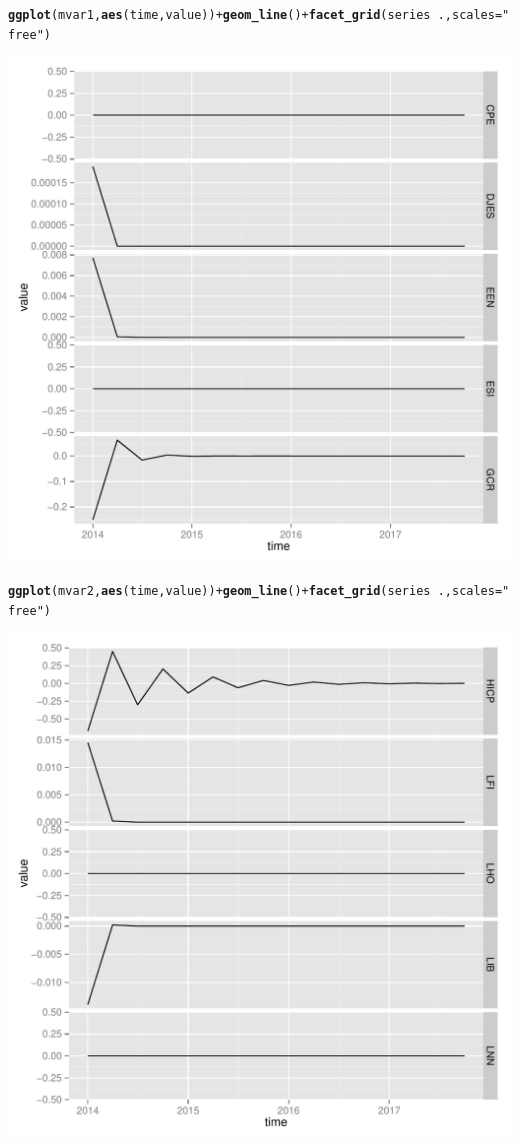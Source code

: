 \documentclass[11pt,oneside, a4paper]{amsart}\usepackage[]{graphicx}\usepackage[]{color}
\makeatletter
\def\maxwidth{ %
  \ifdim\Gin@nat@width>\linewidth
    \linewidth
  \else
    \Gin@nat@width
  \fi
}
\newcommand{\hlstr}[1]{\textcolor[rgb]{0.192,0.494,0.8}{#1}}%
\newcommand{\hlopt}[1]{\textcolor[rgb]{0,0,0}{#1}}%
\newcommand{\hlstd}[1]{\textcolor[rgb]{0.345,0.345,0.345}{#1}}%
\newcommand{\hlkwc}[1]{\textcolor[rgb]{0.333,0.667,0.333}{#1}}%
\newcommand{\hlkwd}[1]{\textcolor[rgb]{0.737,0.353,0.396}{\textbf{#1}}}%
\newenvironment{kframe}{%
 \def\at@end@of@kframe{}%
 \ifinner\ifhmode%
  \def\at@end@of@kframe{\end{minipage}}%
  \begin{minipage}{\columnwidth}%
 \fi\fi%
 \def\FrameCommand##1{\hskip\@totalleftmargin \hskip-\fboxsep
 \colorbox{shadecolor}{##1}\hskip-\fboxsep
     \hskip-\linewidth \hskip-\@totalleftmargin \hskip\columnwidth}%
 \MakeFramed {\advance\hsize-\width
   \@totalleftmargin\z@ \linewidth\hsize
   \@setminipage}}%
 {\par\unskip\endMakeFramed%
 \at@end@of@kframe}
\newenvironment{knitrout}{}{} %
\makeatother
\begin{document}
\begin{knitrout}
\begin{kframe}
\begin{alltt}
\hlkwd{ggplot}\hlstd{(mvar1,} \hlkwd{aes}\hlstd{(time,value))} \hlopt{+} \hlkwd{geom_line}\hlstd{()} \hlopt{+} \hlkwd{facet_grid}\hlstd{(series} \hlopt{~} \hlstd{. ,}\hlkwc{scales}\hlstd{=}\hlstr{"free"}\hlstd{)}
\end{alltt}
\end{kframe}
\includegraphics[width=\maxwidth]{figure/unnamed-chunk-2-1} 
\begin{kframe}\begin{alltt}
\hlkwd{ggplot}\hlstd{(mvar2,} \hlkwd{aes}\hlstd{(time,value))} \hlopt{+} \hlkwd{geom_line}\hlstd{()} \hlopt{+} \hlkwd{facet_grid}\hlstd{(series} \hlopt{~} \hlstd{. ,}\hlkwc{scales}\hlstd{=}\hlstr{"free"}\hlstd{)}
\end{alltt}
\end{kframe}
\includegraphics[width=\maxwidth]{figure/unnamed-chunk-2-2} 

\end{knitrout}
\end{document}
